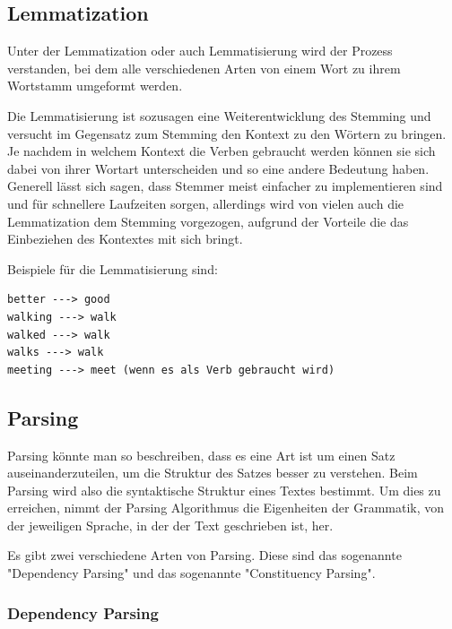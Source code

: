 \subsection{Lemmatization}

Unter der Lemmatization oder auch Lemmatisierung wird der Prozess verstanden, bei dem alle verschiedenen Arten von einem Wort zu ihrem Wortstamm umgeformt werden.

Die Lemmatisierung ist sozusagen eine Weiterentwicklung des Stemming und versucht im Gegensatz zum Stemming den Kontext zu den Wörtern zu bringen.
Je nachdem in welchem Kontext die Verben gebraucht werden können sie sich dabei von ihrer Wortart unterscheiden und so eine andere Bedeutung haben.
Generell lässt sich sagen, dass Stemmer meist einfacher zu implementieren sind und für schnellere Laufzeiten sorgen, allerdings wird von vielen auch die Lemmatization dem Stemming vorgezogen, aufgrund der Vorteile die das Einbeziehen des Kontextes mit sich bringt.\cite{machineLearningTextAnalysis, textAnalysisMonkeylearn, stemmingLemmatization, }


Beispiele für die Lemmatisierung sind:

\begin{lstlisting}[label={lst: Lemmatization}]
better ---> good
walking ---> walk
walked ---> walk
walks ---> walk
meeting ---> meet (wenn es als Verb gebraucht wird)
\end{lstlisting}

\subsection{Parsing}

Parsing könnte man so beschreiben, dass es eine Art ist um einen Satz auseinanderzuteilen, um die Struktur des Satzes besser zu verstehen.
Beim Parsing wird also die syntaktische Struktur eines Textes bestimmt.
Um dies zu erreichen, nimmt der Parsing Algorithmus die Eigenheiten der Grammatik, von der jeweiligen Sprache, in der der Text geschrieben ist, her.\cite{textAnalysisMonkeylearn}

Es gibt zwei verschiedene Arten von Parsing.
Diese sind das sogenannte "Dependency Parsing" und das sogenannte "Constituency Parsing".

\subsubsection{Dependency Parsing}

